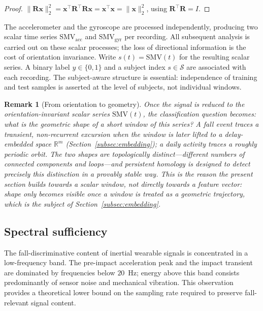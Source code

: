 \documentclass[onluarkali,ingilizce,yukseklisans,karton,LisansustuEgitim]{itutez}
\newtheorem{remark}{Remark}[chapter]
\providecommand{\R}{\mathbb{R}}
\providecommand{\1}{\mathbf{1}}
\providecommand{\Sset}{\mathcal{S}}
\begin{document}
\begin{proof}
$\|\mathbf{R}\mathbf{x}\|_2^2=\mathbf{x}^\top\mathbf{R}^\top\mathbf{R}\mathbf{x}=\mathbf{x}^\top\mathbf{x}=\|\mathbf{x}\|_2^2$, using $\mathbf{R}^\top\mathbf{R}=I$.
\end{proof}

The accelerometer and the gyroscope are processed independently, producing two scalar time series $\mathrm{SMV}_{\mathrm{acc}}$ and $\mathrm{SMV}_{\mathrm{gyr}}$ per recording. All subsequent analysis is carried out on these scalar processes; the loss of directional information is the cost of orientation invariance. Write $s(t)=\mathrm{SMV}(t)$ for the resulting scalar series. A binary label $y\in\{0,1\}$ and a subject index $s\in\Sset$ are associated with each recording. The subject-aware structure is essential: independence of training and test samples is asserted at the level of subjects, not individual windows.

\begin{remark}[From orientation to geometry]
\label{rem:so3-geometry}
Once the signal is reduced to the orientation-invariant scalar series $\mathrm{SMV}(t)$, the classification question becomes: what is the \emph{geometric shape} of a short window of this series? A fall event traces a transient, non-recurrent excursion when the window is later lifted to a delay-embedded space $\R^m$ (Section~\ref{subsec:embedding}); a daily activity traces a roughly periodic orbit. The two shapes are topologically distinct---different numbers of connected components and loops---and persistent homology is designed to detect precisely this distinction in a provably stable way. This is the reason the present section builds towards a \emph{scalar window}, not directly towards a feature vector: shape only becomes visible once a window is treated as a geometric trajectory, which is the subject of Section~\ref{subsec:embedding}.
\end{remark}

\subsection{Spectral sufficiency}
\label{subsubsec:rate}

The fall-discriminative content of inertial wearable signals is concentrated in a low-frequency band. The pre-impact acceleration peak and the impact transient are dominated by frequencies below $20$~Hz; energy above this band consists predominantly of sensor noise and mechanical vibration. This observation provides a theoretical lower bound on the sampling rate required to preserve fall-relevant signal content.
\end{document}
